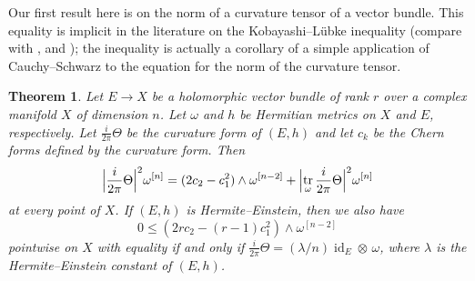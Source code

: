 \documentclass[11pt,a4paper]{amsart}
\def\^#1{^{[#1]}}
\DeclareMathOperator{\tr}{tr}
\DeclareMathOperator{\id}{id}
\def\curv{\frac{i}{2\pi} \Theta}
\newtheorem{theo}{Theorem}[section]
\theoremstyle{definition}
\numberwithin{equation}{section}
\begin{document}
Our first result here is on the norm of a curvature tensor of a vector
bundle. This equality is implicit in the literature on the
Kobayashi--L\"{u}bke inequality (compare with \cite{Chen-Ogiue},
\cite{Lubke} and \cite{Siu}); the inequality is actually a corollary of a
simple application of Cauchy--Schwarz to the equation for the norm of the
curvature tensor.

\begin{theo}
    Let $E \to X$ be a holomorphic vector bundle of rank $r$ over a complex
manifold $X$ of dimension $n$. Let $\omega$ and $h$ be Hermitian metrics on
$X$ and $E$, respectively. Let $\curv$ be the curvature form of $(E,h)$
and let $c_k$ be the Chern forms defined by the curvature form. Then
$$
\Bigl\lvert \curv \Bigr\rvert^2 \omega\^n
= (2 c_2 - c_1^2) \wedge \omega\^{n-2}
+ \Bigl\lvert \tr_\omega \curv \Bigr\rvert^2 \omega\^n
$$
at every point of $X$. If $(E,h)$ is Hermite--Einstein, then we also have
$$
0 \leq 
(2r c_2 - (r-1) c_1^2) \wedge \omega\^{n-2}
$$
pointwise on $X$ with equality if and only if $\curv = (\lambda/n) \id_E
\otimes\, \omega$, where $\lambda$ is the Hermite--Einstein constant of
$(E,h)$.
\end{theo}
\end{document}
